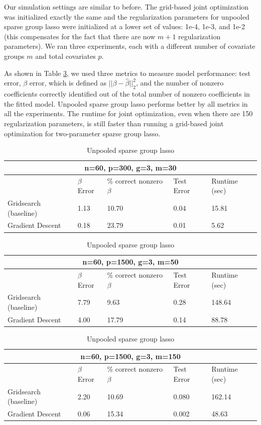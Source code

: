 \documentclass[10pt,letterpaper]{article}
\begin{document}
Our simulation settings are similar to before. The grid-based joint optimization was initialized exactly the same and the regularization parameters for unpooled sparse group lasso were initialized at a lower set of values: 1e-4, 1e-3, and 1e-2 (this compensates for the fact that there are now $m + 1$ regularization parameters). We ran three experiments, each with a different number of covariate groups $m$ and total covariates $p$.

As shown in Table \ref{table:unpooled}, we used three metrics to measure model performance: test error, $\beta$ error, which is defined as $\lvert \lvert \beta - \hat \beta \rvert \rvert_2 ^2$, and the number of nonzero coefficients correctly identified out of the total number of nonzero coefficients in the fitted model. Unpooled sparse group lasso performs better by all metrics in all the experiments. The runtime for joint optimization, even when there are 150 regularization parameters, is still faster than running a grid-based joint optimization for two-parameter sparse group lasso.

\begin{table}
\begin{center}
\begin{tabular}{| l | l | l | l | l | }
\hline
\multicolumn{5}{|c|}{n=60, p=300, g=3, m=30}\\
\hline
 & $\beta$ Error & \% correct nonzero $\beta$ & Test Error & Runtime (sec) \\
\hline
Gridsearch (baseline) & 1.13 & 10.70 & 0.04 & 15.81 \\
\hline
Gradient Descent & 0.18 & 23.79 & 0.01 & 5.62 \\
\hline
\end{tabular}

\begin{tabular}{| l | l | l | l | l | }
\hline
\multicolumn{5}{|c|}{n=60, p=1500, g=3, m=50}\\
\hline
 & $\beta$ Error & \% correct nonzero $\beta$ & Test Error & Runtime (sec) \\
\hline
Gridsearch (baseline) & 7.79 & 9.63 & 0.28 & 148.64 \\
\hline
Gradient Descent & 4.00 & 17.79 & 0.14 & 88.78 \\
\hline
\end{tabular}

\begin{tabular}{| l | l | l | l | l | }
\hline
\multicolumn{5}{|c|}{n=60, p=1500, g=3, m=150}\\
\hline
 & $\beta$ Error & \% correct nonzero $\beta$ & Test Error & Runtime (sec) \\
\hline
Gridsearch (baseline) & 2.20 & 10.69 & 0.080 & 162.14 \\
\hline
Gradient Descent & 0.06 & 15.34 & 0.002 & 48.63 \\
\hline
\end{tabular}
\end{center}
\caption {Unpooled sparse group lasso}
\label{table:unpooled}
\end{table}
\end{document}
